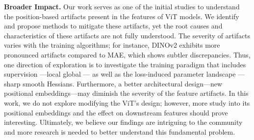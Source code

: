 \documentclass[runningheads]{llncs}
\renewcommand{\paragraph}[1]{\vspace{1.25mm}\noindent\textbf{#1}}
\begin{document}
\paragraph{Broader Impact.} Our work serves as one of the initial studies to understand the position-based artifacts present in the features of ViT models. We identify and propose methods to mitigate these artifacts, yet the root causes and characteristics of these artifacts are not fully understood. The severity of artifacts varies with the training algorithms; for instance, DINOv2 exhibits more pronounced artifacts compared to MAE, which shows subtler discrepancies.
Thus, one direction of exploration is to investigate the training paradigm that includes supervision ---\ie local \vs global --- as well as the loss-induced parameter landscape ---\ie sharp \vs smooth Hessians.
Furthermore, a better architectural design---\eg new positional embeddings---may diminish the severity of the feature artifacts. In this work, we do not explore modifying the ViT's design; however, more study into its positional embeddings and the effect on downstream features should prove interesting.
Ultimately, we believe our findings are intriguing to the community and more research is needed to better understand this fundamental problem.
 
\end{document}
